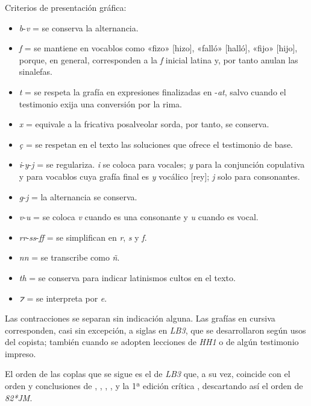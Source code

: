 \documentclass[11pt,a4paper,twoside]{article}
\newcommand{\comillas}[1]{«#1»}
\begin{document}
Criterios de presentación gráfica:

\begin{itemize}[label=--]%
\item \textit{b}-\textit{v} = se conserva la alternancia.
\item \textit{f} = se mantiene en vocablos como \comillas{fizo} [hizo], \comillas{falló} [halló], \comillas{fijo} [hijo], porque, en general, corresponden a la \textit{f} inicial latina y, por tanto anulan las sinalefas.
\item \textit{t} = se respeta la grafía en expresiones finalizadas en -\textit{at}, salvo cuando el testimonio exija una conversión por la rima.
\item \textit{x} = equivale a la fricativa posalveolar sorda, por tanto, se conserva.
\item \textit{ç} = se respetan en el texto las soluciones que ofrece el testimonio de base.
\item \textit{i}-\textit{y}-\textit{j} = se regulariza. \textit{i} se coloca para vocales; \textit{y} para la conjunción copulativa y para vocablos cuya grafía final es \textit{y} vocálico [rey]; \textit{j} solo para consonantes.
\item \textit{g}-\textit{j} = la alternancia se conserva.
\item \textit{v}-\textit{u} = se coloca \textit{v} cuando es una consonante y \textit{u} cuando es vocal.
\item \textit{rr}-\textit{ss}-\textit{ff} = se simplifican en \textit{r}, \textit{s} y \textit{f}.
\item \textit{nn} = se transcribe como \textit{ñ}.
\item \textit{th} = se conserva para indicar latinismos cultos en el texto.
\item \textit{⁊} = se interpreta por \textit{e}.%
\end{itemize}

Las contracciones se separan sin indicación alguna. Las grafías en cursiva corresponden, casi sin excepción, a siglas en \textit{LB3}, que se desarrollaron según usos del copista; también cuando se adopten lecciones de \textit{HH1} o de algún testimonio impreso.

El orden de las coplas que se sigue es el de \textit{LB3} que, a su vez, coincide con el orden y conclusiones de \textcite{Senabre1983}, \textcite{Palumbo1983}, \textcite{Orduna1967}, \textcite{Beltrán1991,Beltrán2013}, \textcite{PérezPriego1990,PérezPriego2017} y la 1ª edición crítica \parencite{Foulché-Delbosc1902}, descartando así el orden de \textit{82*JM}.
\end{document}
